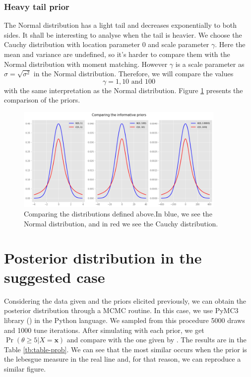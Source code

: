 \documentclass[a4paper,10pt, notitlepage]{report}
\theoremstyle{plain}
\newcommand{\pr}{\operatorname{Pr}} %
\newcommand{\bx}{\boldsymbol{x}} %
\begin{document}
\subsubsection*{Heavy tail prior}

The Normal distribution has a light tail and decreases exponentially to both
sides. It shall be interesting to analyse when the tail is heavier. We choose
the Cauchy distribution with location parameter 0 and scale parameter
$\gamma$. Here the mean and variance are undefined, so it's harder to compare
them with the Normal distribution with moment matching. However $\gamma$ is a scale parameter as $\sigma = \sqrt{\sigma^2}$ in
the Normal distribution. Therefore, we
will compare the values 
$$
\gamma = 1, 10 \text{ and } 100
$$
with the same interpretation as the Normal distribution. Figure
\ref{fig:comparison-priors} presents the comparison of the priors. 

\begin{figure}
    \centering
    \includegraphics[width=0.9\textwidth]{../../images/priors-comparison.png}
    \caption{Comparing the distributions defined above.In blue, we see the Normal distribution, and in red we see the Cauchy distribution.}
    \label{fig:comparison-priors}
\end{figure}

\section*{Posterior distribution in the suggested case}

Considering the data given and the priors elicited previously, we can
obtain the posterior distribution through a MCMC routine. In this case, we use
PyMC3 library (\cite{pymc3}) in the Python language. We sampled from this
procedure 5000 draws and 1000 tune iterations. After simulating with each prior,
we get $\pr(\theta \ge 5 | X = \bx)$ and compare with the one given by
\cite{schervish1996theory}. The results are in the Table \ref{tb:table-prob}.
We can see that the most similar occurs when the prior is the lebesgue measure
in the real line and, for that reason, we can reproduce a similar figure. 
\end{document}
